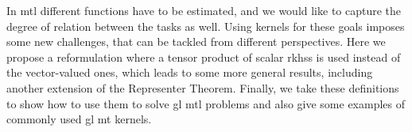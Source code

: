 In \acrshort{mtl} different functions have to be estimated, and we would like to capture the degree of relation between the tasks as well. Using kernels for these goals imposes some new challenges, that can be tackled from different perspectives.
%
Here we propose a reformulation where a tensor product of scalar \acrshort{rkhss} is used instead of the vector-valued ones, which leads to some more general results, including another extension of the Representer Theorem.
%
Finally, we take these definitions to show how to use them to solve \acrshort{gl} \acrshort{mtl} problems and also give some examples of commonly used \acrshort{gl} \acrshort{mt} kernels.





